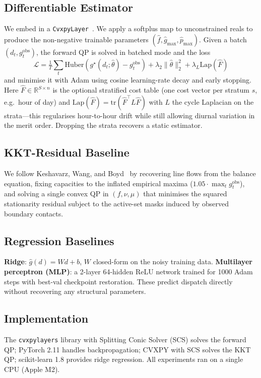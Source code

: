 \documentclass[conference]{IEEEtran}
\newcommand{\R}{\mathbb{R}}
\newcommand{\opt}{^{\star}}
\begin{document}
\subsection{Differentiable Estimator}
We embed  in a \texttt{CvxpyLayer}~\cite{agrawal2019differentiable}.
We apply a softplus map to unconstrained reals to produce the non-negative
trainable parameters $(\hat f,\hat g_{\max},\hat p_{\max})$. Given a batch
$(d_t,g_t^{\mathrm{obs}})$, the forward QP is solved in batched mode and
the loss
\begin{equation}
\mathcal{L} = \tfrac{1}{T}\!\sum_t \mathrm{Huber}(g\opt(d_t;\hat\theta) - g_t^{\mathrm{obs}})
        + \lambda_2\|\hat\theta\|_2^2 + \lambda_L \mathrm{Lap}(\hat F)
\label{eq:loss}
\end{equation}
and minimise it with Adam using cosine learning-rate decay and early stopping. Here
$\hat F\in\R^{S\times n}$ is the optional stratified cost table (one cost
vector per stratum $s$, e.g.\ hour of day) and
$\mathrm{Lap}(\hat F)=\mathrm{tr}(\hat F^\top L\hat F)$ with $L$ the cycle
Laplacian on the strata---this regularises hour-to-hour drift while still
allowing diurnal variation in the merit order. Dropping the strata recovers
a static estimator.

\subsection{KKT-Residual Baseline}
We follow Keshavarz, Wang, and Boyd~\cite{keshavarz2011imputing} by
recovering line flows from the balance equation, fixing capacities to the
inflated empirical maxima ($1.05 \cdot \max_t g_t^{\mathrm{obs}}$), and
solving a single convex QP in
$(f,\nu,\mu)$ that minimises the squared stationarity residual subject to
the active-set masks induced by observed boundary contacts.

\subsection{Regression Baselines}
\textbf{Ridge}: $\hat g(d) = W d + b$, $W$ closed-form on the noisy
training data. \textbf{Multilayer perceptron (MLP)}: a 2-layer 64-hidden
ReLU network trained for 1000 Adam steps with best-val checkpoint
restoration. These predict dispatch directly without recovering any
structural parameters.

\subsection{Implementation}
The \texttt{cvxpylayers} library with Splitting Conic Solver (SCS) solves
the forward QP; PyTorch 2.11 handles backpropagation; CVXPY with SCS solves
the KKT QP; scikit-learn 1.8 provides ridge regression. All experiments
ran on a single CPU (Apple M2).
\end{document}
